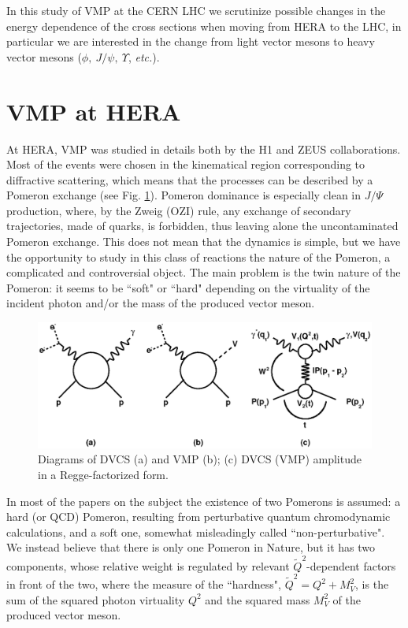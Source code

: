 \documentclass[12pt]{article}
\begin{document}
In this study of VMP at the CERN LHC we scrutinize possible changes in the energy dependence of the cross sections when moving from HERA to the LHC, in particular we are interested in the change from light vector mesons to heavy vector mesons ($\phi,\  J/\psi,\  \Upsilon$,  {\it etc.}).

\section{VMP at HERA}
At HERA, VMP was studied in details both by the H1 and ZEUS collaborations. Most of the events were chosen in the 
kinematical region corresponding to diffractive scattering, which means that the processes can be described by a Pomeron exchange (see Fig. \ref{fig:diagrams}). Pomeron dominance is especially clean in $J/\Psi$ production, where,
by the Zweig (OZI) rule, any exchange of secondary trajectories, made of quarks, is forbidden, thus leaving alone the uncontaminated Pomeron exchange.  This does not mean that the dynamics is simple, but we have the opportunity 
to study in this class of reactions the nature of the Pomeron, a complicated and controversial object. 
The main problem is the twin nature of the Pomeron: it seems to be ``soft" or ``hard" depending on the virtuality of the incident photon and/or the mass of the produced vector meson.   
     
\begin{figure}[!h]
\centering
\includegraphics[width=.8\textwidth]{figures/diagrams.eps}
\caption{Diagrams of DVCS (a) and VMP (b); (c) DVCS (VMP) amplitude in a Regge-factorized form.}
\label{fig:diagrams}
\end{figure}

In most of the papers on the subject the existence of two Pomerons is assumed: a hard (or QCD) Pomeron, resulting from 
perturbative quantum chromodynamic calculations, and a soft one, somewhat misleadingly called ``non-perturbative". 
We instead believe that there is only one Pomeron in Nature, but it has two components, whose relative weight is 
regulated by relevant $\widetilde Q^2$-dependent factors in front of the two, where the measure of the ``hardness", $\widetilde Q^2=Q^2+M_V^2$, is the sum of the squared photon virtuality $Q^2$ and the squared mass $M^2_V$ of the produced vector meson.  
\end{document}
